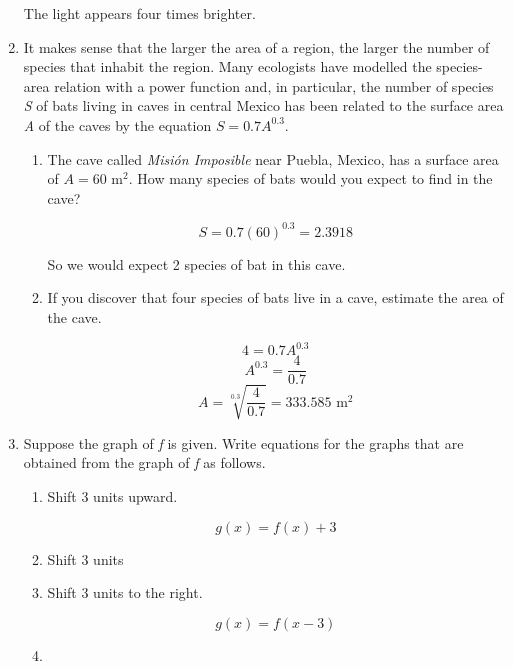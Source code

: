 \documentclass{article}
\begin{document}
\begin{enumerate}
			The light appears four times brighter.
			
		\item It makes sense that the larger the area of a region, the larger the number of species that inhabit the
			region. Many ecologists have modelled the species-area relation with a power function and, in particular,
			the number of species \emph{S} of bats living in caves in central Mexico has been related to the surface
			area \emph{A} of the caves by the equation $S = 0.7A^{0.3}$.

			\begin{enumerate}
				\item The cave called \emph{Misi\'{o}n Imposible} near Puebla, Mexico, has a surface area of
					$A = 60 \text{ m}^{2}$. How many species of bats would you expect to find in the cave?
					
					$$ S = 0.7(60)^{0.3} = 2.3918$$

					So we would expect 2 species of bat in this cave.

				\item If you discover that four species of bats live in a cave, estimate the area of the cave.

					$$4 = 0.7A^{0.3}$$
					$$A^{0.3} = \frac{4}{0.7}$$
					$$A = \sqrt[0.3]{\frac{4}{0.7}} = 333.585 \text{ m}^{2}$$
			\end{enumerate}

		\item Suppose the graph of \emph{f} is given. Write equations for the graphs that are obtained from the graph
			of \emph{f} as follows.

		\begin{enumerate}
			\item Shift 3 units upward.

				$$g(x) = f(x) + 3$$

			\item Shift 3 units 

			\item Shift 3 units to the right.

				$$g(x) = f(x - 3)$$

			\item 
		\end{enumerate}
			
	\end{enumerate}
\end{document}
